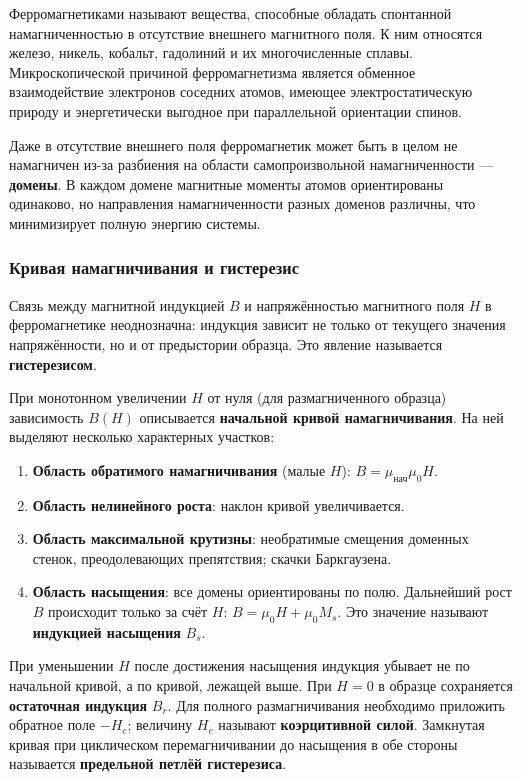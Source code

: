 \documentclass[a4paper]{article}
\begin{document}
	Ферромагнетиками называют вещества, способные обладать спонтанной намагниченностью в отсутствие внешнего магнитного поля. К ним относятся железо, никель, кобальт, гадолиний и их многочисленные сплавы. Микроскопической причиной ферромагнетизма является обменное взаимодействие электронов соседних атомов, имеющее электростатическую природу и энергетически выгодное при параллельной ориентации спинов.
	
	Даже в отсутствие внешнего поля ферромагнетик может быть в целом не намагничен из-за разбиения на области самопроизвольной намагниченности — \textbf{домены}. В каждом домене магнитные моменты атомов ориентированы одинаково, но направления намагниченности разных доменов различны, что минимизирует полную энергию системы.
	
	\subsubsection{Кривая намагничивания и гистерезис}
	
	Связь между магнитной индукцией $B$ и напряжённостью магнитного поля $H$ в ферромагнетике неоднозначна: индукция зависит не только от текущего значения напряжённости, но и от предыстории образца. Это явление называется \textbf{гистерезисом}.
	
	При монотонном увеличении $H$ от нуля (для размагниченного образца) зависимость $B(H)$ описывается \textbf{начальной кривой намагничивания}. На ней выделяют несколько характерных участков:
	
	\begin{enumerate}
		\item \textbf{Область обратимого намагничивания} (малые $H$): $B = \mu_{\text{нач}} \mu_0 H$.
		\item \textbf{Область нелинейного роста}: наклон кривой увеличивается.
		\item \textbf{Область максимальной крутизны}: необратимые смещения доменных стенок, преодолевающих препятствия; скачки Баркгаузена.
		\item \textbf{Область насыщения}: все домены ориентированы по полю. Дальнейший рост $B$ происходит только за счёт $H$: $B = \mu_0 H + \mu_0 M_s$. Это значение называют \textbf{индукцией насыщения} $B_s$.
	\end{enumerate}
	
	При уменьшении $H$ после достижения насыщения индукция убывает не по начальной кривой, а по кривой, лежащей выше. При $H = 0$ в образце сохраняется \textbf{остаточная индукция} $B_r$. Для полного размагничивания необходимо приложить обратное поле $-H_c$; величину $H_c$ называют \textbf{коэрцитивной силой}. Замкнутая кривая при циклическом перемагничивании до насыщения в обе стороны называется \textbf{предельной петлёй гистерезиса}.
	
\end{document}
